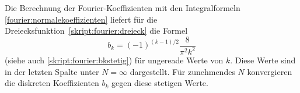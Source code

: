 Die Berechnung der Fourier-Koeffizienten mit den Integralformeln
\eqref{fourier:normalekoeffizienten}
liefert für die Dreiecksfunktion~\eqref{skript:fourier:dreieck}
die Formel
\[
b_k = (-1)^{(k-1)/2}\frac{8}{\pi^2k^2}
\]
(siehe auch \eqref{skript:fourier:bkstetig})
für ungereade Werte von $k$.
Diese Werte sind in der letzten Spalte unter $N=\infty$ dargestellt.
Für zunehmendes $N$ konvergieren die diskreten Koeffizienten $b_k$ gegen 
diese stetigen Werte.

